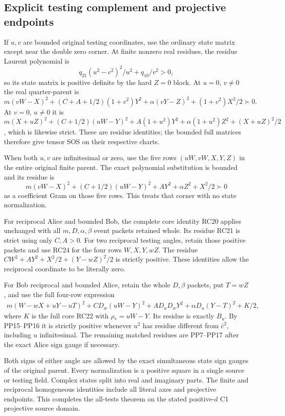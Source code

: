 \subsection{Explicit testing complement and projective endpoints}

If $u,v$ are bounded original testing coordinates, use the ordinary
state matrix except near the double zero corner. At finite nonzero
real residues, the residue Laurent polynomial is
\[
 q_{21}(u^2-c^2)^2/u^2+q_{10}/v^2>0,
 \tag{PP18}
\]
so its state matrix is positive definite by the hard $Z=0$ block.
At $u=0$, $v\ne0$ the real quarter-parent is
\[
 m(vW-X)^2+(C+A+1/2)(1+v^2)Y^2
                       +\alpha(vY-Z)^2+(1+v^2)X^2/2\succ0.
\]
At $v=0$, $u\ne0$ it is
$m(X+uZ)^2+(C+1/2)(uW-Y)^2+A(1+u^2)Y^2
+\alpha(1+u^2)Z^2+(X+uZ)^2/2$, which is likewise strict.
These are residue identities; the bounded full matrices therefore
give tensor SOS on their respective charts.

When both $u,v$ are infinitesimal or zero, use the five rows
$(uW,vW,X,Y,Z)$ in the entire original finite parent. The exact
polynomial substitution is bounded and its residue is
\[
 m(vW-X)^2+(C+1/2)(uW-Y)^2+AY^2+\alpha Z^2+X^2/2\succ0
 \tag{PP19}
\]
as a coefficient Gram on those five rows. This treats that corner
with no state normalization.

For reciprocal Alice and bounded Bob, the complete core identity
RC20 applies unchanged with all $m,D,\alpha,\beta$ event packets
retained whole. Its residue RC21 is strict using only $C,A>0$.
For two reciprocal testing angles, retain those positive packets
and use RC24 for the four rows $W,X,Y,wZ$. The residue
$CW^2+AY^2+X^2/2+(Y-wZ)^2/2$ is strictly positive.
These identities allow the reciprocal coordinate to be literally zero.

For Bob reciprocal and bounded Alice, retain the whole $D,\beta$
packets, put $T=wZ$, and use the full four-row expression
\[
\begin{split}
 m(W-wX+uY-uT)^2+CD_w(uW-Y)^2
          +AD_uD_wY^2+\alpha D_u(Y-T)^2+K/2,
\end{split}
\]
where $K$ is the full core RC22 with $\rho_*=uW-Y$.
Its residue is exactly $B_u$. By PP15--PP16 it is strictly
positive whenever $u^2$ has residue different from $\bar c^2$,
including $u$ infinitesimal. The remaining matched residues are
PP7--PP17 after the exact Alice sign gauge if necessary.

Both signs of either angle are allowed by the exact simultaneous
state sign gauges of the original parent. Every normalization is
a positive square in a single source or testing field. Complex
states split into real and imaginary parts. The finite and
reciprocal homogeneous identities include all literal axes and
projective endpoints. This completes the all-tests theorem on the
stated positive-$d$ C1 projective source domain.

